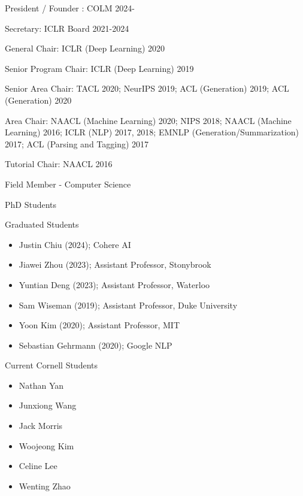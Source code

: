 \documentclass[10pt]{article}
\begin{document}
\medskip


\bigskip

\ind President / Founder :
\ind COLM 2024-

\ind Secretary:
\ind ICLR Board 2021-2024

\ind General  Chair:
\ind ICLR (Deep Learning) 2020

\ind Senior Program Chair:
\ind ICLR (Deep Learning) 2019

\ind Senior Area Chair:
\ind TACL 2020; NeurIPS 2019; ACL (Generation) 2019; ACL (Generation) 2020

\ind Area Chair:
\ind NAACL (Machine Learning) 2020; NIPS 2018; NAACL (Machine Learning) 2016; ICLR (NLP) 2017, 2018; EMNLP (Generation/Summarization) 2017; ACL (Parsing and Tagging) 2017

\ind Tutorial Chair: NAACL 2016

\bigskip

\medskip

\ind Field Member - Computer Science

\ind PhD Students


\ind Graduated Students

\begin{itemize}
	\item Justin Chiu (2024); Cohere AI
	\item Jiawei Zhou (2023); Assistant Professor, Stonybrook
	\item Yuntian Deng (2023); Assistant Professor, Waterloo
	\item Sam Wiseman (2019); Assistant Professor, Duke University
	\item Yoon Kim (2020); Assistant Professor, MIT
	\item Sebastian Gehrmann (2020); Google NLP
\end{itemize}


\ind Current Cornell Students

\begin{itemize}
	\item Nathan Yan
	\item Junxiong Wang
	\item Jack Morris
	\item Woojeong Kim
	\item Celine Lee
	\item Wenting Zhao
\end{itemize}


\medskip
\end{document}

